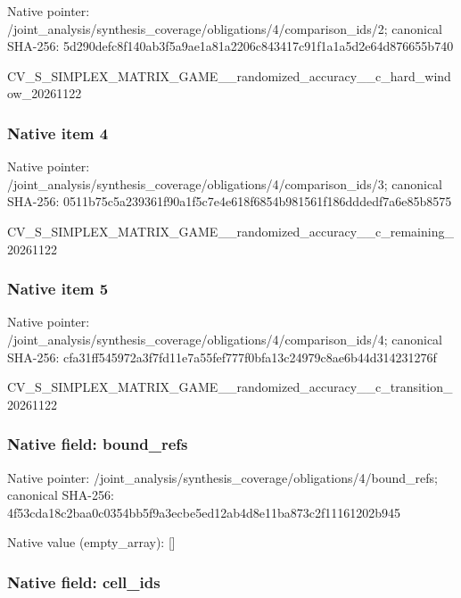\documentclass[10pt,a4paper]{article}
\begin{document}
Native pointer: /joint\_analysis/synthesi\allowbreak{}s\_coverage/obligations/4\allowbreak{}/comparison\_ids/2; canonical SHA-256: 5d290defc8f140ab3f5a9ae1\allowbreak{}a81a2206c843417c91f1a1a5\allowbreak{}d2e64d876655b740


CV\_S\_SIMPLEX\_MATRIX\_GAME\allowbreak{}\_\_randomized\_accuracy\_\_c\allowbreak{}\_hard\_window\_20261122


\subsubsection{Native item 4}


Native pointer: /joint\_analysis/synthesi\allowbreak{}s\_coverage/obligations/4\allowbreak{}/comparison\_ids/3; canonical SHA-256: 0511b75c5a239361f90a1f5c\allowbreak{}7e4e618f6854b981561f186d\allowbreak{}ddedf7a6e85b8575


CV\_S\_SIMPLEX\_MATRIX\_GAME\allowbreak{}\_\_randomized\_accuracy\_\_c\allowbreak{}\_remaining\_20261122


\subsubsection{Native item 5}


Native pointer: /joint\_analysis/synthesi\allowbreak{}s\_coverage/obligations/4\allowbreak{}/comparison\_ids/4; canonical SHA-256: cfa31ff545972a3f7fd11e7a\allowbreak{}55fef777f0bfa13c24979c8a\allowbreak{}e6b44d314231276f


CV\_S\_SIMPLEX\_MATRIX\_GAME\allowbreak{}\_\_randomized\_accuracy\_\_c\allowbreak{}\_transition\_20261122


\subsubsection{Native field: bound\_refs}


Native pointer: /joint\_analysis/synthesi\allowbreak{}s\_coverage/obligations/4\allowbreak{}/bound\_refs; canonical SHA-256: 4f53cda18c2baa0c0354bb5f\allowbreak{}9a3ecbe5ed12ab4d8e11ba87\allowbreak{}3c2f11161202b945



Native value (empty\_array): []



\subsubsection{Native field: cell\_ids}
\end{document}
